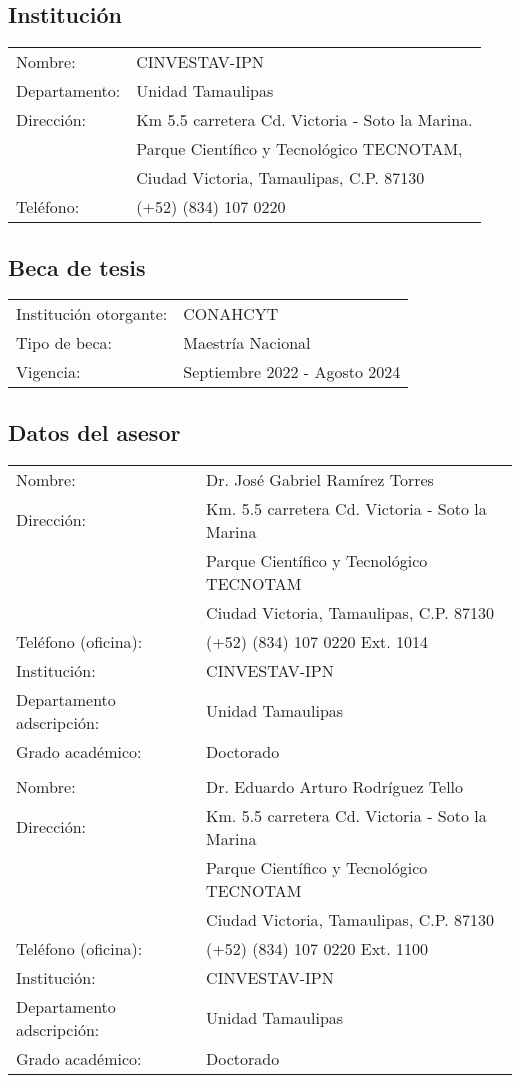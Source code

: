 \documentclass[11pt,epsf,times]{article}
\begin{document}
\subsection*{Instituci\'{o}n}
\begin{tabular}{ll} 
Nombre:  &          CINVESTAV-IPN \\
Departamento:    &  Unidad Tamaulipas\\
Direcci\'{o}n:   &  Km 5.5 carretera Cd. Victoria - Soto la Marina.\\
                 &  Parque Cient\'{i}fico y Tecnol\'{o}gico TECNOTAM,\\
                 &  Ciudad Victoria, Tamaulipas, C.P. 87130\\
Tel\'{e}fono:    & (+52) (834) 107 0220\\
\end{tabular}
\subsection*{Beca de tesis}
\begin{tabular}{ll} 
Instituci\'{o}n otorgante:  &  CONAHCYT  \\
Tipo de beca:      & Maestr\'ia Nacional\\
Vigencia:    &   Septiembre 2022 - Agosto 2024
\end{tabular}

\subsection*{Datos del asesor}
\begin{tabular}{ll} 
Nombre:  &   Dr. Jos\'{e} Gabriel Ram\'{i}rez Torres \\
Direcci\'{o}n:   &   Km. 5.5 carretera Cd. Victoria - Soto la Marina\\
                 &  Parque Cient\'{i}fico y Tecnol\'{o}gico TECNOTAM\\
                 &  Ciudad Victoria, Tamaulipas, C.P. 87130\\
Tel\'{e}fono (oficina):    &  (+52) (834) 107 0220 Ext. 1014 \\ 
Instituci\'{o}n:    &  CINVESTAV-IPN \\ 
Departamento adscripci\'{o}n: &  Unidad Tamaulipas\\
Grado acad\'{e}mico: & Doctorado \\\\
Nombre:  &   Dr. Eduardo Arturo Rodr\'{i}guez Tello \\
Direcci\'{o}n:   &   Km. 5.5 carretera Cd. Victoria - Soto la Marina\\
                 &  Parque Cient\'{i}fico y Tecnol\'{o}gico TECNOTAM\\
                 &  Ciudad Victoria, Tamaulipas, C.P. 87130\\
Tel\'{e}fono (oficina):    &  (+52) (834) 107 0220 Ext. 1100\\ 
Instituci\'{o}n:    &  CINVESTAV-IPN \\ 
Departamento adscripci\'{o}n: &  Unidad Tamaulipas\\
Grado acad\'{e}mico: & Doctorado 
\end{tabular}
\end{document}

